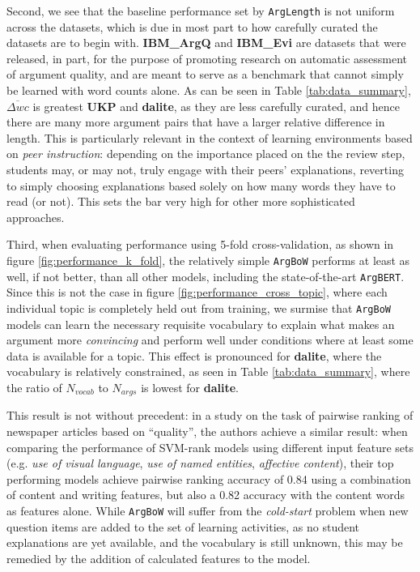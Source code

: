 \documentclass[runningheads]{llncs}
\begin{document}
Second, we see that the baseline performance set by \verb|ArgLength| is 
not uniform across the datasets, which is due in most part to how carefully 
curated the datasets are to begin with.
\textbf{IBM\_ArgQ} and \textbf{IBM\_Evi} are datasets that were released, in 
part, for the purpose of promoting research on automatic assessment of argument 
quality, and are meant to serve as a benchmark that cannot simply be learned 
with word counts alone.   
As can be seen in Table \ref{tab:data_summary}, $\overline{\Delta wc}$ is 
greatest \textbf{UKP} and \textbf{dalite}, as they are less carefully curated, 
and hence there are many more argument pairs that have a larger relative 
difference in length. 
This is particularly relevant in the context of learning environments based 
on \textit{peer instruction}: depending on the importance placed on the the 
review step, students may, or may not, truly engage with their peers' 
explanations, reverting to simply choosing explanations based solely on how 
many words they have to read (or not). 
This sets the bar very high for other more sophisticated approaches.

Third, when evaluating performance using 5-fold cross-validation, as shown in 
figure \ref{fig:performance_k_fold}, the relatively simple \verb|ArgBoW| 
performs at least as well, if not better, than all other models, including the 
state-of-the-art \verb|ArgBERT|.
Since this is not the case in figure \ref{fig:performance_cross_topic}, where 
each individual topic is completely held out from training, we surmise that  
\verb|ArgBoW| models can learn the necessary requisite vocabulary 
to explain what makes an argument more \textit{convincing} and perform well 
under conditions where at least some data is available for a topic. 
This effect is pronounced for \textbf{dalite}, where the vocabulary is 
relatively constrained, as seen in Table \ref{tab:data_summary}, where the 
ratio of $N_{vocab}$ to $N_{args}$ is lowest for \textbf{dalite}. 

This result is not without precedent: in a study on the task of pairwise 
ranking of newspaper articles based on ``quality'', the authors achieve a 
similar result: when comparing the performance of SVM-rank models using 
different input feature sets (e.g. \textit{use of visual language}, \textit{use 
of named entities}, \textit{affective content}), their top performing models 
achieve pairwise ranking accuracy of 0.84 using a combination of content and 
writing features, but also a 0.82 accuracy with the content words as features 
alone\cite{louis_what_2013}.
While \verb|ArgBoW| will suffer from the \textit{cold-start} problem when new 
question items are added to the set of learning activities, as no student 
explanations are yet available, and the vocabulary is still unknown, this may 
be remedied by the addition of calculated features to the model.
\end{document}
